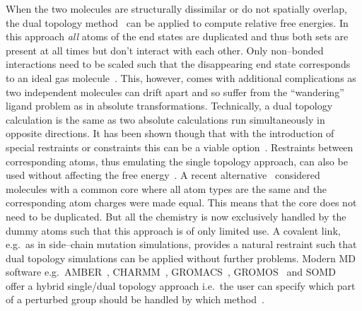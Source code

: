\documentclass[journal=jctcce,manuscript=article]{achemso}
\begin{document}
When the two molecules are structurally dissimilar or do not spatially overlap, 
the dual topology method~\cite{doi:10.1021/j100056a020, doi:10.1021/jp981628n} 
can be applied to compute relative free energies.  In this approach \emph{all} 
atoms of the end states are duplicated and thus both sets are present at all
times but don't interact with each other.  Only non--bonded
interactions need to be scaled such that the disappearing end state
corresponds to an ideal gas molecule~\cite{doi:10.1021/jp981628n}.
This, however, comes with additional complications as two independent
molecules can drift apart and so suffer from the ``wandering'' ligand
problem as in absolute transformations\cite{GILSON19971047,
doi:10.1021/jp0217839, deng_computations_2009}.  Technically, a dual topology 
calculation is the same as two absolute calculations run simultaneously in 
opposite directions.  It has been shown though that with the introduction of 
special restraints or constraints this can be a viable 
option~\cite{doi:10.1021/ct700081t,
  rocklin_separated_2013, JCC:Axelsen-Li}.  Restraints between 
corresponding atoms, thus emulating the single topology approach, can also be 
used without affecting the free energy~\cite{JCC:Axelsen-Li}.  A recent 
alternative~\cite{doi:10.1021/acs.jctc.5b00179} considered molecules with a
common core where all atom types are the same and the corresponding atom 
charges were made equal.  This means that the core does not need to be 
duplicated.  But all the chemistry is now exclusively handled by the dummy 
atoms such that this approach is of only limited use.
A covalent link, e.g.\ as in side--chain
mutation simulations, provides a natural restraint such that dual
topology simulations can be applied without further problems.  Modern
MD software e.g.\ AMBER~\cite{case_amber_2005},
CHARMM~\cite{JCC:JCC21287}, GROMACS~\cite{Abraham201519},
GROMOS~\cite{doi:10.1021/jp984217f} and SOMD~\cite{Sire-2016,
  doi:10.1021/ct300857j}
offer a hybrid single/dual topology approach
i.e.\ the user can specify which part of a perturbed group should be
handled by which method~\cite{doi:10.1021/jp994193s}.
\end{document}
